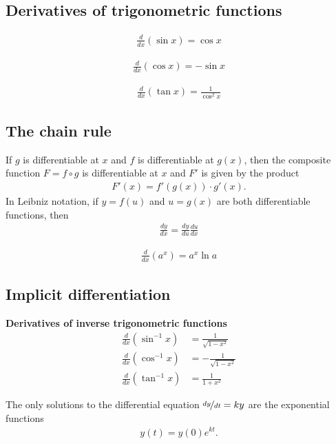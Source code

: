 \documentclass{article}
\begin{document}
\subsection{Derivatives of trigonometric functions}
\begin{theorem}
	\begin{align*}
		\frac{d}{dx}(\sin x)=\cos x
	\end{align*}
\end{theorem}
\begin{theorem}
	\begin{align*}
		\frac{d}{dx}(\cos x)=-\sin x
	\end{align*}
\end{theorem}
\begin{theorem}
	\begin{align*}
		\frac{d}{dx}(\tan x)=\frac{1}{\cos^2 x}
	\end{align*}
\end{theorem}
\subsection{The chain rule}
\begin{theorem}
	If $g$ is differentiable at $x$ and $f$ is differentiable at $g(x)$, then the composite function $F=f\circ g$ is differentiable at $x$ and $F'$ is given by the product
	\begin{align*}
		F'(x)=f'(g(x))\cdot g'(x).
	\end{align*}
	In Leibniz notation, if $y=f(u)$ and $u=g(x)$ are both differentiable functions, then
	\begin{align*}
		\frac{dy}{dx}=\frac{dy}{du}\frac{du}{dx}
	\end{align*}
\end{theorem}
\begin{theorem}
	\begin{align*}
		\frac{d}{dx}(a^x)=a^x\ln a
	\end{align*}
\end{theorem}
\subsection{Implicit differentiation}
\begin{theorem}
	\textbf{Derivatives of inverse trigonometric functions}\\
	\begin{align*}
		\frac{d}{dx}(\sin^{-1}x) & =\frac{1}{\sqrt{1-x^2}}  \\
		\frac{d}{dx}(\cos^{-1}x) & =-\frac{1}{\sqrt{1-x^2}} \\
		\frac{d}{dx}(\tan^{-1}x) & =\frac{1}{1+x^2}
	\end{align*}
\end{theorem}
\begin{theorem}
	The only solutions to the differential equation $\nicefrac{dy}{dt}=ky$ are the exponential functions
	\begin{align*}
		y(t)=y(0)e^{kt}.
	\end{align*}
\end{theorem}
\setcounter{subsection}{9}
\end{document}
